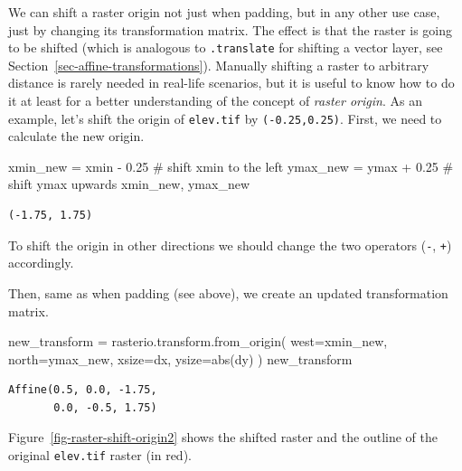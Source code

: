 \documentclass[
  letterpaper,
]{krantz}
\newenvironment{Shaded}{\begin{snugshade}}{\end{snugshade}}
\newcommand{\BuiltInTok}[1]{\textcolor[rgb]{0.00,0.23,0.31}{#1}}
\newcommand{\CommentTok}[1]{\textcolor[rgb]{0.37,0.37,0.37}{#1}}
\newcommand{\FloatTok}[1]{\textcolor[rgb]{0.68,0.00,0.00}{#1}}
\newcommand{\NormalTok}[1]{\textcolor[rgb]{0.00,0.23,0.31}{#1}}
\newcommand{\OperatorTok}[1]{\textcolor[rgb]{0.37,0.37,0.37}{#1}}
\begin{document}
We can shift a raster origin not just when padding, but in any other use
case, just by changing its transformation matrix. The effect is that the
raster is going to be shifted (which is analogous to \texttt{.translate}
for shifting a vector layer, see
Section~\ref{sec-affine-transformations}). Manually shifting a raster to
arbitrary distance is rarely needed in real-life scenarios, but it is
useful to know how to do it at least for a better understanding of the
concept of \emph{raster origin}. As an example, let's shift the origin
of \texttt{elev.tif} by \texttt{(-0.25,0.25)}. First, we need to
calculate the new origin.

\begin{Shaded}
\begin{Highlighting}[]
\NormalTok{xmin\_new }\OperatorTok{=}\NormalTok{ xmin }\OperatorTok{{-}} \FloatTok{0.25}  \CommentTok{\# shift xmin to the left}
\NormalTok{ymax\_new }\OperatorTok{=}\NormalTok{ ymax }\OperatorTok{+} \FloatTok{0.25}  \CommentTok{\# shift ymax upwards}
\NormalTok{xmin\_new, ymax\_new}
\end{Highlighting}
\end{Shaded}

\begin{verbatim}
(-1.75, 1.75)
\end{verbatim}

To shift the origin in other directions we should change the two
operators (\texttt{-}, \texttt{+}) accordingly.

Then, same as when padding (see above), we create an updated
transformation matrix.

\begin{Shaded}
\begin{Highlighting}[]
\NormalTok{new\_transform }\OperatorTok{=}\NormalTok{ rasterio.transform.from\_origin(}
\NormalTok{    west}\OperatorTok{=}\NormalTok{xmin\_new, }
\NormalTok{    north}\OperatorTok{=}\NormalTok{ymax\_new, }
\NormalTok{    xsize}\OperatorTok{=}\NormalTok{dx, }
\NormalTok{    ysize}\OperatorTok{=}\BuiltInTok{abs}\NormalTok{(dy)}
\NormalTok{)}
\NormalTok{new\_transform}
\end{Highlighting}
\end{Shaded}

\begin{verbatim}
Affine(0.5, 0.0, -1.75,
       0.0, -0.5, 1.75)
\end{verbatim}

Figure~\ref{fig-raster-shift-origin2} shows the shifted raster and the
outline of the original \texttt{elev.tif} raster (in red).
\end{document}
